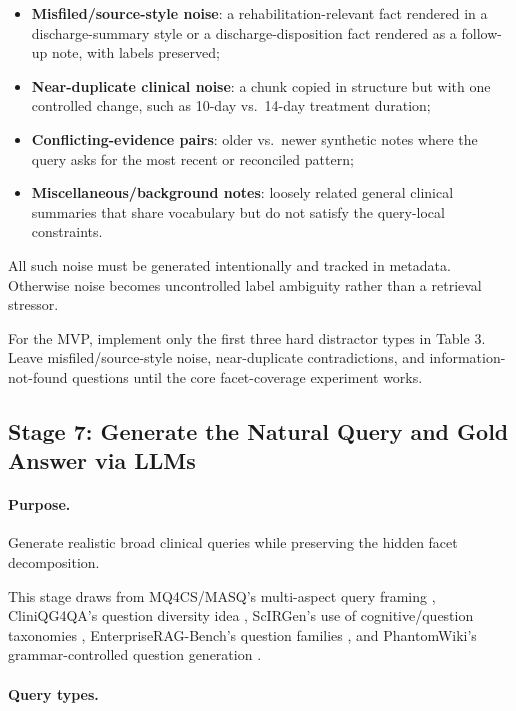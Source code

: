 \documentclass[11pt,a4paper]{article}
\newcommand{\stage}[2]{\subsection{\textcolor{betterblue}{#1}: #2}}
\begin{document}
\begin{itemize}[leftmargin=*]
	\item \textbf{Misfiled/source-style noise}: a rehabilitation-relevant fact rendered in a discharge-summary style or a discharge-disposition fact rendered as a follow-up note, with labels preserved;
	\item \textbf{Near-duplicate clinical noise}: a chunk copied in structure but with one controlled change, such as 10-day vs.\ 14-day treatment duration;
	\item \textbf{Conflicting-evidence pairs}: older vs.\ newer synthetic notes where the query asks for the most recent or reconciled pattern;
	\item \textbf{Miscellaneous/background notes}: loosely related general clinical summaries that share vocabulary but do not satisfy the query-local constraints.
\end{itemize}

All such noise must be generated intentionally and tracked in metadata. Otherwise noise becomes uncontrolled label ambiguity rather than a retrieval stressor.

For the MVP, implement only the first three hard distractor types in Table 3. Leave misfiled/source-style noise, near-duplicate contradictions, and information-not-found questions until the core facet-coverage experiment works.

\stage{Stage 7}{Generate the Natural Query and Gold Answer via LLMs}

\paragraph{Purpose.}
Generate realistic broad clinical queries while preserving the hidden facet decomposition.

This stage draws from MQ4CS/MASQ's multi-aspect query framing \citep{abbasiantaeb2026multiaspect}, CliniQG4QA's question diversity idea \citep{yue2021cliniqg4qa}, ScIRGen's use of cognitive/question taxonomies \citep{lin2025scirgen}, EnterpriseRAG-Bench's question families \citep{sun2026enterpriseragbench}, and PhantomWiki's grammar-controlled question generation \citep{gong2025phantomwiki}.

\paragraph{Query types.}
\end{document}
